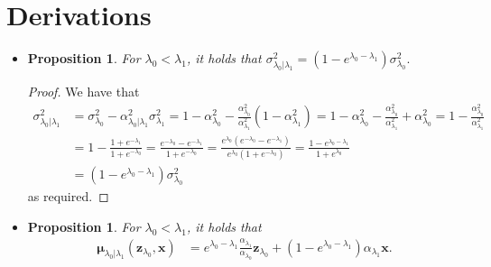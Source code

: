 \documentclass[10pt]{article}
\newtheorem{proposition}[lemma]{Proposition}
\newcommand{\ve}[1]{\mathbf{#1}}
\newcommand{\ves}[1]{\boldsymbol{#1}}
\begin{document}
\appendix

\section{Derivations}

\begin{itemize}
\item \begin{proposition} \label{thm:sigma-lambda-simplified}
  For $\lambda_0 < \lambda_1$, it holds that
  $\sigma^2_{\lambda_0|\lambda_1} = (1 - e^{\lambda_0 - \lambda_1})\sigma_{\lambda_0}^2.$
\end{proposition}

\begin{proof} We have that
  \begin{align*}
    \sigma^2_{\lambda_0|\lambda_1}
    &= \sigma^2_{\lambda_0} - \alpha^2_{\lambda_0|\lambda_1} \sigma^2_{\lambda_1} 
    = 1 - \alpha^2_{\lambda_0} - \frac{\alpha_{\lambda_0}^2}{\alpha_{\lambda_1}^2} (1 - \alpha^2_{\lambda_1}) 
    = 1 - \alpha_{\lambda_0}^2 - \frac{\alpha_{\lambda_0}^2}{\alpha_{\lambda_1}^2} + \alpha_{\lambda_0}^2
    = 1 - \frac{\alpha_{\lambda_0}^2}{\alpha_{\lambda_1}^2} 
    \\
    &= 1 - \frac{1 + e^{-\lambda_1}}{1 + e^{-\lambda_0}} 
    = \frac{e^{-\lambda_0} - e^{-\lambda_1}}{1 + e^{-\lambda_0}}
    = \frac{e^{\lambda_0}(e^{-\lambda_0} - e^{-\lambda_1})}{e^{\lambda_0}(1 + e^{-\lambda_0})}
    = \frac{1 - e^{\lambda_0-\lambda_1}}{1 + e^{\lambda_0}} 
    \\
    &= (1 - e^{\lambda_0-\lambda_1}) \sigma_{\lambda_0}^2
  \end{align*}
  as required.
\end{proof}

\item \begin{proposition} \label{thm:backward-conditional-prob-simplified}
  For $\lambda_0 < \lambda_1$, it holds that
  \begin{align*}
    \ves{\mu}_{\lambda_0|\lambda_1} (\ve{z}_{\lambda_0}, \ve{x})
    &= e^{\lambda_0 - \lambda_1} \frac{\alpha_{\lambda_1}}{\alpha_{\lambda_0}} \ve{z}_{\lambda_0} + (1 - e^{\lambda_0 - \lambda_1})\alpha_{\lambda_1} \ve{x}.
  \end{align*}
\end{proposition}


\end{itemize}
\end{document}
